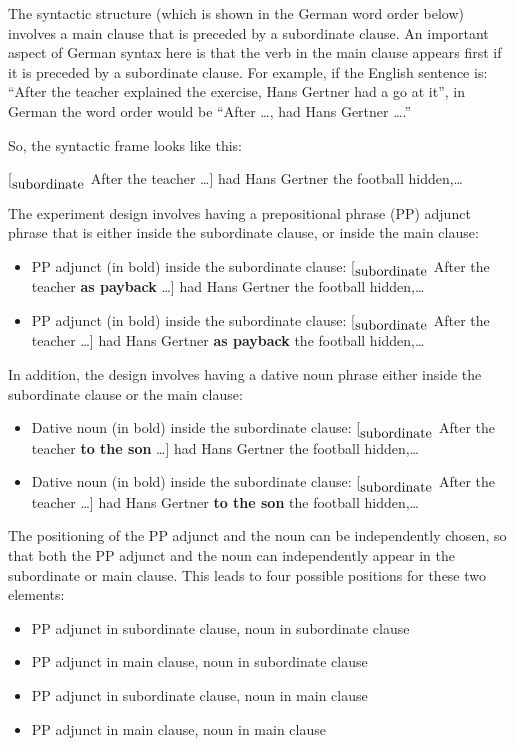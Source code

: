 \documentclass[
  12pt,
]{krantz}
\providecommand{\tightlist}{%
  \setlength{\itemsep}{0pt}\setlength{\parskip}{0pt}}
\theoremstyle{definition}
\theoremstyle{definition}
\theoremstyle{definition}
\theoremstyle{definition}
\theoremstyle{remark}
\begin{document}
The syntactic structure (which is shown in the German word order below) involves a main clause that is preceded by a subordinate clause. An important aspect of German syntax here is that the verb in the main clause appears first if it is preceded by a subordinate clause. For example, if the English sentence is: ``After the teacher explained the exercise, Hans Gertner had a go at it'', in German the word order would be ``After \dots, had Hans Gertner \dots.''

So, the syntactic frame looks like this:

{[}\(_{\hbox{subordinate}}\) After the teacher \dots{]}
had Hans Gertner the football hidden,\dots 

The experiment design involves having a prepositional phrase (PP) adjunct phrase that is either inside the subordinate clause, or inside the main clause:

\begin{itemize}
\tightlist
\item
  PP adjunct (in bold) inside the subordinate clause:
  {[}\(_{\hbox{subordinate}}\) After the teacher \textbf{as payback} \dots{]} had Hans Gertner the football hidden,\dots 
\item
  PP adjunct (in bold) inside the subordinate clause:
  {[}\(_{\hbox{subordinate}}\) After the teacher \dots{]} had Hans Gertner \textbf{as payback} the football hidden,\dots
\end{itemize}

In addition, the design involves having a dative noun phrase either inside the subordinate clause or the main clause:

\begin{itemize}
\tightlist
\item
  Dative noun (in bold) inside the subordinate clause:
  {[}\(_{\hbox{subordinate}}\) After the teacher \textbf{to the son} \dots{]} had Hans Gertner the football hidden,\dots 
\item
  Dative noun (in bold) inside the subordinate clause:
  {[}\(_{\hbox{subordinate}}\) After the teacher \dots{]} had Hans Gertner \textbf{to the son} the football hidden,\dots
\end{itemize}

The positioning of the PP adjunct and the noun can be independently chosen, so that both the PP adjunct and the noun can independently appear in the subordinate or main clause. This leads to four possible positions for these two elements:

\begin{itemize}
\tightlist
\item
  PP adjunct in subordinate clause, noun in subordinate clause
\item
  PP adjunct in main clause, noun in subordinate clause
\item
  PP adjunct in subordinate clause, noun in main clause
\item
  PP adjunct in main clause, noun in main clause
\end{itemize}
\end{document}
